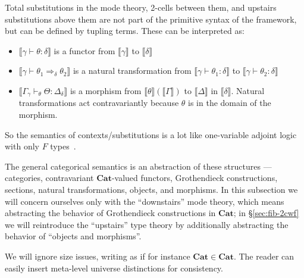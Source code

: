 \documentclass[10pt]{article}
\theoremstyle{definition}
\newcommand{\yields}{\vdash}
\newcommand{\tcell}{\Rightarrow}
\newcommand\mm[1]{\llbracket #1 \rrbracket}
\newcommand\Cat{\mathbf{Cat}}
\begin{document}
Total substitutions in the mode theory, 2-cells between them, and
upstairs substitutions above them are not part of the primitive syntax
of the framework, but can be defined by tupling terms.
These can be interpreted as: 
\begin{itemize}
\item $\mm{\gamma \yields \theta : \delta}$ is a functor from $\mm{\gamma}$ to $\mm{\delta}$
\item $\mm{\gamma \yields \theta_1 \tcell_\delta \theta_2}$ is a natural
  transformation from $\mm{\gamma \yields \theta_1 : \delta}$ to
  $\mm{\gamma \yields \theta_2 : \delta}$
\item $\mm{\Gamma_{\gamma} \yields_\theta \Theta : \Delta_\delta}$ is a
  morphism from $\mm{\theta}(\mm{\Gamma})$ to $\mm{\Delta}$ in
  $\mm{\delta}$.
  Natural transformations act contravariantly because $\theta$ is in the
  domain of the morphism.  
  \end{itemize}
So the semantics of contexts/substitutions is a lot like 
one-variable adjoint logic with only $F$ types~\cite{ls15adjoint}.  

The general categorical semantics is an abstraction of these structures --- categories, contravariant $\Cat$-valued functors, Grothendieck constructions, sections, natural transformations, objects, and morphisms.
In this subsection we will concern ourselves only with the ``downstairs'' mode theory, which means abstracting the behavior of Grothendieck constructions in $\Cat$; in \S\ref{sec:fib-2cwf} we will reintroduce the ``upstairs'' type theory by additionally abstracting the behavior of ``objects and morphisms''.

We will ignore size issues, writing as if for instance $\Cat\in\Cat$.
The reader can easily insert meta-level universe distinctions for consistency.
\end{document}
